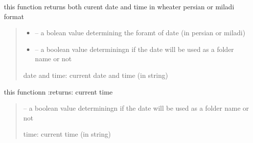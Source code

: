 \documentclass[letterpaper,10pt,english]{sphinxmanual}
\begin{document}
\begin{savenotes}\begin{fulllineitems}
\label{\detokenize{setting/backend/date_funcs:oxin.backend.date_funcs.get_datetime}}
\pysigstartsignatures
{}
\pysigstopsignatures
\sphinxAtStartPar
this function returns both curent date and time in wheater persian or miladi format
\begin{quote}\begin{description}
\begin{itemize}
\item {} 
\sphinxAtStartPar
{} – a bolean value determining the foramt of date (in persian or miladi)

\item {} 
\sphinxAtStartPar
{} – a boolean value determiningn if the date will be used as a folder name or not

\end{itemize}

\sphinxAtStartPar
date and time: current date and time (in string)

\end{description}\end{quote}

\end{fulllineitems}\end{savenotes}


\begin{savenotes}\begin{fulllineitems}
\label{\detokenize{setting/backend/date_funcs:oxin.backend.date_funcs.get_time}}
\pysigstartsignatures
{}
\pysigstopsignatures
\sphinxAtStartPar
this functionn :returns: current time
\begin{quote}\begin{description}
\sphinxAtStartPar
{} – a boolean value determiningn if the date will be used as a folder name or not

\sphinxAtStartPar
time: current time (in string)

\end{description}\end{quote}

\end{fulllineitems}\end{savenotes}
\end{document}

